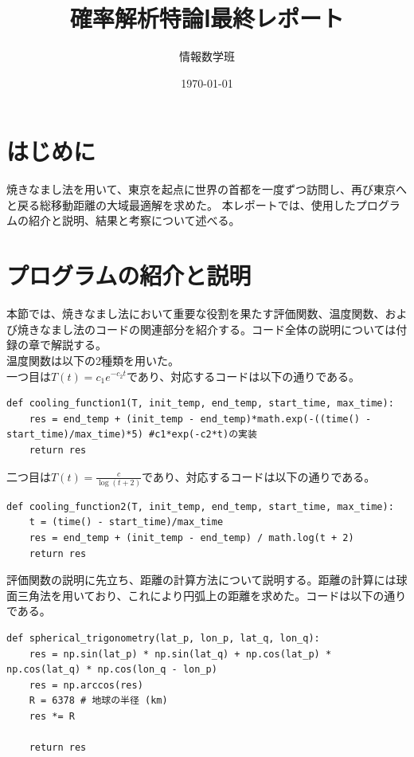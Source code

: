 \documentclass[a4paper,11pt]{ltjsarticle}
\begin{document}
\title{確率解析特論Ⅰ最終レポート}
\author{情報数学班}
\date{\today}
\maketitle
\tableofcontents

\section{はじめに}
焼きなまし法を用いて、東京を起点に世界の首都を一度ずつ訪問し、再び東京へと戻る総移動距離の大域最適解を求めた。
本レポートでは、使用したプログラムの紹介と説明、結果と考察について述べる。
\section{プログラムの紹介と説明}
本節では、焼きなまし法において重要な役割を果たす評価関数、温度関数、および焼きなまし法のコードの関連部分を紹介する。コード全体の説明については付録の章で解説する。\\

温度関数は以下の2種類を用いた。\\
一つ目は$T(t)=c_{1}e^{-c_{2}t}$であり、対応するコードは以下の通りである。
\begin{lstlisting}
def cooling_function1(T, init_temp, end_temp, start_time, max_time):
    res = end_temp + (init_temp - end_temp)*math.exp(-((time() - start_time)/max_time)*5) #c1*exp(-c2*t)の実装
    return res
\end{lstlisting}
\clearpage
二つ目は$T(t)=\frac{c}{\log{(t+2)}}$であり、対応するコードは以下の通りである。
\begin{lstlisting}
def cooling_function2(T, init_temp, end_temp, start_time, max_time):
    t = (time() - start_time)/max_time
    res = end_temp + (init_temp - end_temp) / math.log(t + 2)
    return res    
\end{lstlisting}

評価関数の説明に先立ち、距離の計算方法について説明する。距離の計算には球面三角法を用いており、これにより円弧上の距離を求めた。コードは以下の通りである。
\begin{lstlisting}
def spherical_trigonometry(lat_p, lon_p, lat_q, lon_q):
    res = np.sin(lat_p) * np.sin(lat_q) + np.cos(lat_p) * np.cos(lat_q) * np.cos(lon_q - lon_p)
    res = np.arccos(res)
    R = 6378 # 地球の半径 (km)
    res *= R
    
    return res
\end{lstlisting}
\end{document}
